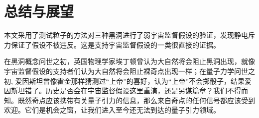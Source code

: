 \chapter{总结与展望}

本文采用了测试粒子的方法对三种黑洞进行了弱宇宙监督假设的验证，发现静电斥力保证了假设不被违反。这是支持宇宙监督假设的一类很直接的证据。

在黑洞概念问世之初，英国物理学家埃丁顿曾认为大自然将会阻止黑洞出现，就像宇宙监督假设的支持者们认为大自然将会阻止裸奇点出现一样；在量子力学问世之初, 爱因斯坦曾像霍金那样猜测过“上帝”的喜好，认为“上帝”不会掷骰子，结果爱因斯坦错了。历史是否会在宇宙监督假设这里重演，还是另谋篇章？我们不得而知。既然奇点应该携带有关量子引力的信息，那么来自奇点的任何信号都应该受到欢迎。它们是机会之窗，让我们进入至今还无法到达的量子引力领域。